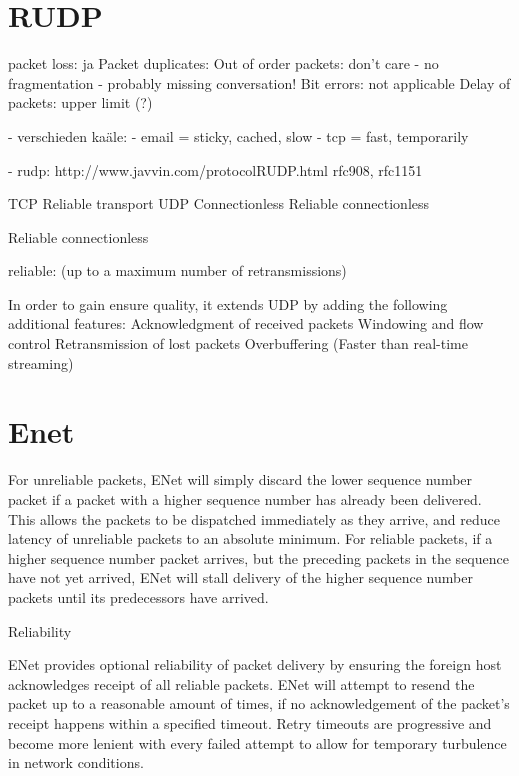 \section{RUDP}

packet loss: ja
Packet duplicates:
Out of order packets: don't care - no fragmentation
    - probably missing conversation!
    Bit errors: not applicable
    Delay of packets: upper limit (?) 


    - verschieden kaäle:
        - email = sticky, cached, slow
            - tcp = fast, temporarily

            - rudp:
                http://www.javvin.com/protocolRUDP.html
                        rfc908, rfc1151

TCP Reliable transport
UDP
Connectionless
Reliable connectionless\cite{rfc768}

Reliable connectionless\cite{rfc908,rfc1151}

reliable: (up to a maximum number of retransmissions)

In order to gain ensure quality, it extends UDP by adding the following additional features:
Acknowledgment of received packets
Windowing and flow control
Retransmission of lost packets
Overbuffering (Faster than real-time streaming)

\section{Enet}
For unreliable packets, ENet will simply discard the lower sequence number packet if a packet with a higher sequence number has already been delivered. This allows the packets to be dispatched immediately as they arrive, and reduce latency of unreliable packets to an absolute minimum. For reliable packets, if a higher sequence number packet arrives, but the preceding packets in the sequence have not yet arrived, ENet will stall delivery of the higher sequence number packets until its predecessors have arrived.


Reliability

ENet provides optional reliability of packet delivery by ensuring the foreign host acknowledges receipt of all reliable packets. ENet will attempt to resend the packet up to a reasonable amount of times, if no acknowledgement of the packet's receipt happens within a specified timeout. Retry timeouts are progressive and become more lenient with every failed attempt to allow for temporary turbulence in network conditions.

